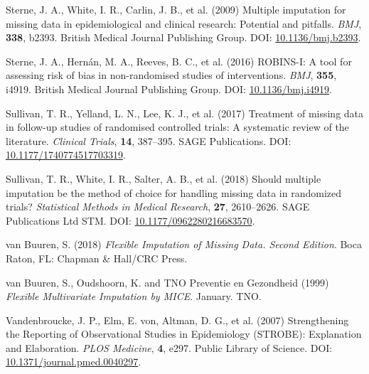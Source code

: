\documentclass[
  letterpaper,
  DIV=11,
  numbers=noendperiod]{scrreprt}
\newlength{\cslhangindent}
\newlength{\cslentryspacingunit} %
\newenvironment{CSLReferences}[2] %
 {%
  \setlength{\parindent}{0pt}
  \ifodd #1
  \let\oldpar\par
  \def\par{\hangindent=\cslhangindent\oldpar}
  \fi
  \setlength{\parskip}{#2\cslentryspacingunit}
 }%
 {}
\begin{document}
\begin{CSLReferences}{1}{0}
\leavevmode{}%
Sterne, J. A., White, I. R., Carlin, J. B., et al. (2009) Multiple
imputation for missing data in epidemiological and clinical research:
Potential and pitfalls. \emph{BMJ}, \textbf{338}, b2393. British Medical
Journal Publishing Group. DOI:
\href{https://doi.org/10.1136/bmj.b2393}{10.1136/bmj.b2393}.

\leavevmode{}%
Sterne, J. A., Hernán, M. A., Reeves, B. C., et al. (2016) {ROBINS-I}: A
tool for assessing risk of bias in non-randomised studies of
interventions. \emph{BMJ}, \textbf{355}, i4919. British Medical Journal
Publishing Group. DOI:
\href{https://doi.org/10.1136/bmj.i4919}{10.1136/bmj.i4919}.

\leavevmode{}%
Sullivan, T. R., Yelland, L. N., Lee, K. J., et al. (2017) Treatment of
missing data in follow-up studies of randomised controlled trials: {A}
systematic review of the literature. \emph{Clinical Trials},
\textbf{14}, 387--395. SAGE Publications. DOI:
\href{https://doi.org/10.1177/1740774517703319}{10.1177/1740774517703319}.

\leavevmode{}%
Sullivan, T. R., White, I. R., Salter, A. B., et al. (2018) Should
multiple imputation be the method of choice for handling missing data in
randomized trials? \emph{Statistical Methods in Medical Research},
\textbf{27}, 2610--2626. SAGE Publications Ltd STM. DOI:
\href{https://doi.org/10.1177/0962280216683570}{10.1177/0962280216683570}.

\leavevmode{}%
van Buuren, S. (2018) \emph{Flexible Imputation of Missing Data.
{Second} Edition}. Boca Raton, FL: Chapman \& Hall/CRC Press.

\leavevmode{}%
van Buuren, S., Oudshoorn, K. and TNO Preventie en Gezondheid (1999)
\emph{Flexible {Multivariate Imputation} by {MICE}}. January. TNO.

\leavevmode{}%
Vandenbroucke, J. P., Elm, E. von, Altman, D. G., et al. (2007)
Strengthening the {Reporting} of {Observational Studies} in
{Epidemiology} ({STROBE}): {Explanation} and {Elaboration}. \emph{PLOS
Medicine}, \textbf{4}, e297. Public Library of Science. DOI:
\href{https://doi.org/10.1371/journal.pmed.0040297}{10.1371/journal.pmed.0040297}.


\end{CSLReferences}
\end{document}
